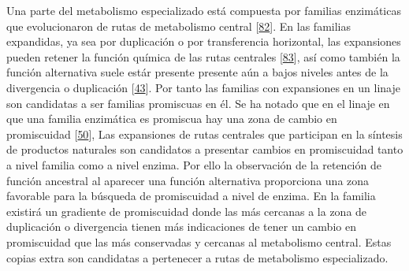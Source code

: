 \documentclass[12pt,twoside]{reedthesis}
\begin{document}
  Una parte del metabolismo especializado está compuesta por familias
  enzimáticas que evolucionaron de rutas de metabolismo central
  {[}\protect\hyperlink{ref-caetano-anolles_origin_metabolism_2009}{82}{]}.
  En las familias expandidas, ya sea por duplicación o por transferencia
  horizontal, las expansiones pueden retener la función química de las
  rutas centrales
  {[}\protect\hyperlink{ref-schniete_expanding_2018}{83}{]}, así como
  también la función alternativa suele estár presente presente aún a bajos
  niveles antes de la divergencia o duplicación
  {[}\protect\hyperlink{ref-soskine_mutational_2010}{43}{]}. Por tanto las
  familias con expansiones en un linaje son candidatas a ser familias
  promiscuas en él. Se ha notado que en el linaje en que una familia
  enzimática es promiscua hay una zona de cambio en promiscuidad
  {[}\protect\hyperlink{ref-noda-garcia_insights_2015}{50}{]}, Las
  expansiones de rutas centrales que participan en la síntesis de
  productos naturales son candidatos a presentar cambios en promiscuidad
  tanto a nivel familia como a nivel enzima. Por ello la observación de la
  retención de función ancestral al aparecer una función alternativa
  proporciona una zona favorable para la búsqueda de promiscuidad a nivel
  de enzima. En la familia existirá un gradiente de promiscuidad donde las
  más cercanas a la zona de duplicación o divergencia tienen más
  indicaciones de tener un cambio en promiscuidad que las más conservadas
  y cercanas al metabolismo central. Estas copias extra son candidatas a
  pertenecer a rutas de metabolismo especializado.
  
\end{document}
